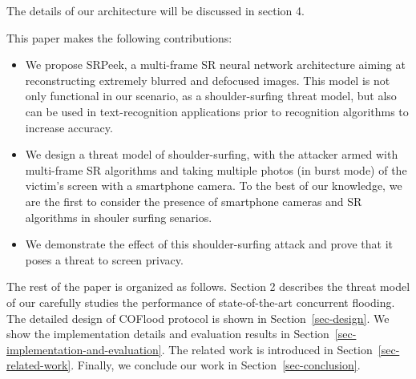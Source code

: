 The details of our architecture will be discussed in section 4.

This paper makes the following contributions:

\begin{itemize}
  \item	We propose SRPeek, a multi-frame SR neural network architecture aiming at reconstructing extremely blurred and defocused images. This model is not only functional in our scenario, as a shoulder-surfing threat model, but also can be used in text-recognition applications prior to recognition algorithms to increase accuracy.
  \item	We design a threat model of shoulder-surfing, with the attacker armed with multi-frame SR algorithms and taking multiple photos (in burst mode) of the victim’s screen with a smartphone camera. To the best of our knowledge, we are the first to consider the presence of smartphone cameras and SR algorithms in shouler surfing senarios.
  \item	We demonstrate the effect of this shoulder-surfing attack and prove that it poses a threat to screen privacy.
\end{itemize}

The rest of the paper is organized as follows. Section 2 describes the threat model of our  carefully studies the performance of state-of-the-art concurrent flooding. The detailed design of COFlood protocol is shown in Section~\ref{sec-design}. We show the implementation details and evaluation results in Section~\ref{sec-implementation-and-evaluation}. The related work is introduced in Section~\ref{sec-related-work}. Finally, we conclude our work in Section~\ref{sec-conclusion}.
